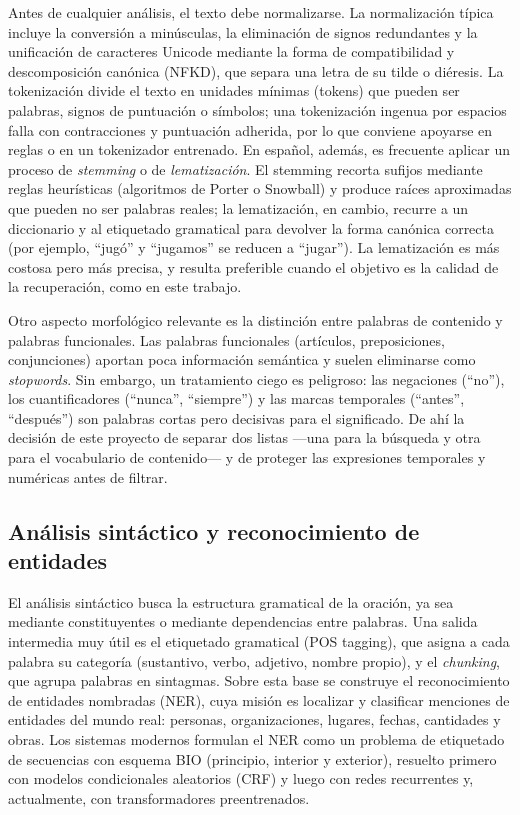 \documentclass[12pt,a4paper]{article}
\begin{document}
Antes de cualquier análisis, el texto debe normalizarse. La normalización típica incluye la conversión a minúsculas, la eliminación de signos redundantes y la unificación de caracteres Unicode mediante la forma de compatibilidad y descomposición canónica (NFKD), que separa una letra de su tilde o diéresis. La tokenización divide el texto en unidades mínimas (tokens) que pueden ser palabras, signos de puntuación o símbolos; una tokenización ingenua por espacios falla con contracciones y puntuación adherida, por lo que conviene apoyarse en reglas o en un tokenizador entrenado. En español, además, es frecuente aplicar un proceso de \emph{stemming} o de \emph{lematización}. El stemming recorta sufijos mediante reglas heurísticas (algoritmos de Porter o Snowball) y produce raíces aproximadas que pueden no ser palabras reales; la lematización, en cambio, recurre a un diccionario y al etiquetado gramatical para devolver la forma canónica correcta (por ejemplo, ``jugó'' y ``jugamos'' se reducen a ``jugar''). La lematización es más costosa pero más precisa, y resulta preferible cuando el objetivo es la calidad de la recuperación, como en este trabajo.

Otro aspecto morfológico relevante es la distinción entre palabras de contenido y palabras funcionales. Las palabras funcionales (artículos, preposiciones, conjunciones) aportan poca información semántica y suelen eliminarse como \emph{stopwords}. Sin embargo, un tratamiento ciego es peligroso: las negaciones (``no''), los cuantificadores (``nunca'', ``siempre'') y las marcas temporales (``antes'', ``después'') son palabras cortas pero decisivas para el significado. De ahí la decisión de este proyecto de separar dos listas —una para la búsqueda y otra para el vocabulario de contenido— y de proteger las expresiones temporales y numéricas antes de filtrar.

\subsection{Análisis sintáctico y reconocimiento de entidades}

El análisis sintáctico busca la estructura gramatical de la oración, ya sea mediante constituyentes o mediante dependencias entre palabras. Una salida intermedia muy útil es el etiquetado gramatical (POS tagging), que asigna a cada palabra su categoría (sustantivo, verbo, adjetivo, nombre propio), y el \emph{chunking}, que agrupa palabras en sintagmas. Sobre esta base se construye el reconocimiento de entidades nombradas (NER), cuya misión es localizar y clasificar menciones de entidades del mundo real: personas, organizaciones, lugares, fechas, cantidades y obras. Los sistemas modernos formulan el NER como un problema de etiquetado de secuencias con esquema BIO (principio, interior y exterior), resuelto primero con modelos condicionales aleatorios (CRF) y luego con redes recurrentes y, actualmente, con transformadores preentrenados.
\end{document}
